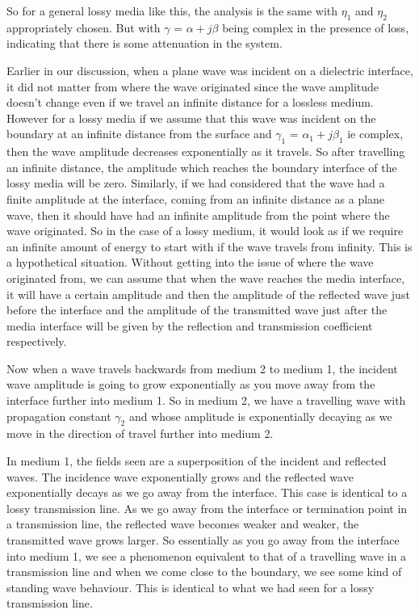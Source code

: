 So for a general lossy media like this, the analysis is the same with $\eta_1$ and $\eta_2$ appropriately chosen. But with $\gamma$ = $\alpha + j\beta$ being complex in the presence of loss, indicating that there is some attenuation in the system. 

Earlier in our discussion, when a plane wave was incident on a dielectric interface, it did not matter from where the wave originated since the wave amplitude doesn't change even if we travel an infinite distance for a lossless medium. However for a lossy media if we assume that this wave was incident on the boundary at an infinite distance from the surface and $\gamma_1$ = $\alpha_1 + j\beta_1$ ie complex, then the wave amplitude decreases exponentially as it travels. So after travelling an infinite distance, the amplitude which reaches the boundary interface of the lossy media will be zero. Similarly, if we had considered that the wave had a finite amplitude at the interface, coming from an infinite distance as a plane wave, then it should have had an infinite amplitude from the point where the wave originated. So in the case of a lossy medium, it would look as if we require an infinite amount of energy to start with if the wave travels from infinity. This is a hypothetical situation. Without getting into the issue of where the wave originated from, we can assume that when the wave reaches the media interface, it will have a certain amplitude and then the amplitude of the reflected wave just before the interface and the amplitude of the transmitted wave just after the media interface will be given by the reflection and transmission coefficient respectively. 

Now when a wave travels backwards from medium 2 to medium 1, the incident wave amplitude is going to grow exponentially as you move away from the interface further into medium 1. So in medium 2, we have a travelling wave with propagation constant $\gamma_2$ and whose amplitude is exponentially decaying as we move in the direction of travel further into medium 2.

In medium 1, the fields seen are a superposition of the incident and reflected waves. The incidence wave exponentially grows and the reflected wave exponentially decays as we go away from the interface. This case is identical to a lossy transmission line. As we go away from the interface or termination point in a transmission line, the reflected wave becomes weaker and weaker, the transmitted wave grows larger. So essentially as you go away from the interface into medium 1, we see a phenomenon equivalent to that of a travelling wave in a transmission line and when we come close to the boundary, we see some kind of standing wave behaviour. This is identical to what we had seen for a lossy transmission line.

